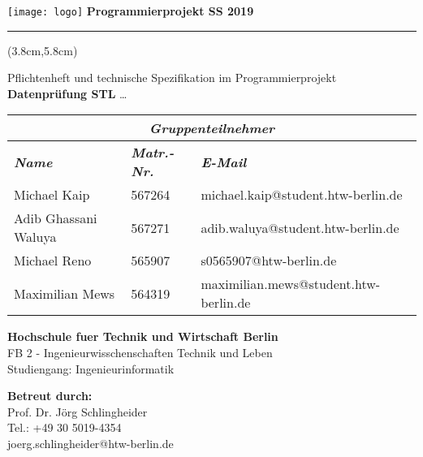 \documentclass[fontsize=10pt, listof = totoc]{scrartcl}
\author{Michael Kaip | Adib Ghassani Waluya | Michael Reno | Maximilian Mews}
\date{}
\begin{document}
\begin{titlepage}
\vspace*{-\headsep}\vspace{-\headheight}
\noindent
\texttt{[image: logo]}
\hfill
\textbf{Programmierprojekt SS 2019}\\[-1ex]
\rule{\linewidth}{1pt}

\begin{textblock*}{13cm}(3.8cm,5.8cm)%
\noindent\parbox[t][7cm][c]{\linewidth}{
\centering
\vfill
\large Pflichtenheft und technische Spezifikation im Programmierprojekt
\vfill
\LARGE\textbf{Datenprüfung STL}
\vfill
\large \dots
\vfill
}
\end{textblock*}

\vfill\vfill\vfill\vfill\vfill%

\begin{table}[htbp]
\centering
\begin{tabular}{|l|l|l|}
\hline
\multicolumn{3}{|c|}{\textit{\textbf{Gruppenteilnehmer}}}                                    \\ \hline
\textit{\textbf{Name}} 	& \textit{\textbf{Matr.-Nr.}} & \textit{\textbf{E-Mail}}              \\ \hline
Michael Kaip           		& 567264		& michael.kaip@student.htw-berlin.de    \\ \hline
Adib Ghassani Waluya  	& 567271		& adib.waluya@student.htw-berlin.de    \\ \hline
Michael Reno           		& 565907		& s0565907@htw-berlin.de                	\\ \hline
Maximilian Mews       		& 564319		& maximilian.mews@student.htw-berlin.de \\ \hline
\end{tabular}
\end{table}

\vfill\vfill
\raggedright
\textbf{Hochschule fuer Technik und Wirtschaft Berlin}\\
FB 2 - Ingenieurwisschenschaften Technik und Leben\\
Studiengang: Ingenieurinformatik

\vfill
\textbf{Betreut durch:}\\
Prof. Dr. Jörg Schlingheider\\
Tel.: +49 30 5019-4354\\
 joerg.schlingheider@htw-berlin.de
\end{titlepage}
\newpage
\tableofcontents\newpage
{}
\listoffigures\newpage
\listoftables\newpage
{}
\end{document}
